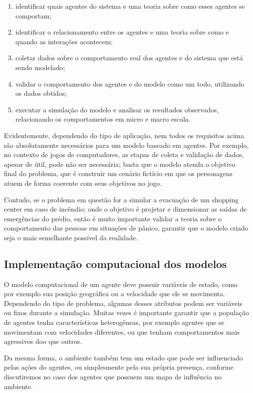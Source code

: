 \documentclass[preprint,12pt]{elsarticle}
\begin{document}
\begin{enumerate}
	\item identificar quais agentes do sistema e uma teoria sobre como esses agentes se comportam;
	\item identificar o relacionamento entre os agentes e uma teoria sobre como e quando as interações acontecem;
	\item coletar dados sobre o comportamento real dos agentes e do sistema que está sendo modelado;
	\item validar o comportamento dos agentes e do modelo como um todo, utilizando os dados obtidos;
	\item executar a simulação do modelo e analisar os resultados observados, relacionando os comportamentos em micro e macro escala.
\end{enumerate}

Evidentemente, dependendo do tipo de aplicação, nem todos os requisitos acima são absolutamente necessários para um modelo baseado em agentes. Por exemplo, no contexto de jogos de computadores, as etapas de coleta e validação de dados, apesar de útil, pode não ser necessária;  basta que o modelo atenda o objetivo final do problema, que é construir um cenário fictício em que os personagens atuem de forma coerente com seus objetivos no jogo.

Contudo, se o problema em questão for a simular a evacuação de um shopping center em caso de incêndio; onde o objetivo é projetar e dimensionar as saídas de emergências do prédio, então é muito importante validar a teoria sobre o comportamento das pessoas em situações de pânico, garantir que o modelo criado seja o mais semelhante possível da realidade.

\subsection{Implementação computacional dos modelos}
\label{subsec:implementacao}

O modelo computacional de um agente deve possuir variáveis de estado, como por exemplo sua posição geográfica ou a velocidade que ele se movimenta. Dependendo do tipo de problema, algumas desses atributos podem ser variáveis ou fixos durante a simulação. Muitas vezes é importante garantir que a população de agentes tenha características heterogêneas, por exemplo agentes que se movimentam com velocidades diferentes, ou que tenham comportamentos mais agressivos doo que outros.

Da mesma forma, o ambiente também tem um estado que pode ser influenciado pelas ações do agentes, ou simplesmente pela sua própria presença, conforme discutiremos no caso dos agentes que possuem um mapa de influência no ambiente.
\end{document}
